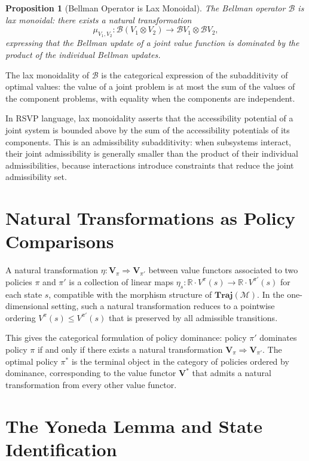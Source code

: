 \documentclass[12pt, a4paper, openany]{book}
\theoremstyle{plain}
\newtheorem{proposition}[theorem]{Proposition}
\theoremstyle{definition}
\theoremstyle{remark}
\newcommand{\BellmanOp}{\mathcal{B}}
\begin{document}
\begin{proposition}[Bellman Operator is Lax Monoidal]
The Bellman operator $\BellmanOp$ is lax monoidal: there exists a natural transformation
\[
\mu_{V_1, V_2}: \BellmanOp(V_1 \otimes V_2) \to \BellmanOp V_1 \otimes \BellmanOp V_2,
\]
expressing that the Bellman update of a joint value function is dominated by the product of the individual Bellman updates.
\end{proposition}

The lax monoidality of $\BellmanOp$ is the categorical expression of the subadditivity of optimal values: the value of a joint problem is at most the sum of the values of the component problems, with equality when the components are independent.

In RSVP language, lax monoidality asserts that the accessibility potential of a joint system is bounded above by the sum of the accessibility potentials of its components. This is an admissibility subadditivity: when subsystems interact, their joint admissibility is generally smaller than the product of their individual admissibilities, because interactions introduce constraints that reduce the joint admissibility set.

\section{Natural Transformations as Policy Comparisons}

A natural transformation $\eta: \mathbf{V}_\pi \Rightarrow \mathbf{V}_{\pi'}$ between value functors associated to two policies $\pi$ and $\pi'$ is a collection of linear maps $\eta_s: \mathbb{R} \cdot V^\pi(s) \to \mathbb{R} \cdot V^{\pi'}(s)$ for each state $s$, compatible with the morphism structure of $\mathbf{Traj}(\mathcal{M})$. In the one-dimensional setting, such a natural transformation reduces to a pointwise ordering $V^\pi(s) \leq V^{\pi'}(s)$ that is preserved by all admissible transitions.

This gives the categorical formulation of policy dominance: policy $\pi'$ dominates policy $\pi$ if and only if there exists a natural transformation $\mathbf{V}_\pi \Rightarrow \mathbf{V}_{\pi'}$. The optimal policy $\pi^*$ is the terminal object in the category of policies ordered by dominance, corresponding to the value functor $\mathbf{V}^*$ that admits a natural transformation from every other value functor.

\section{The Yoneda Lemma and State Identification}
\end{document}
